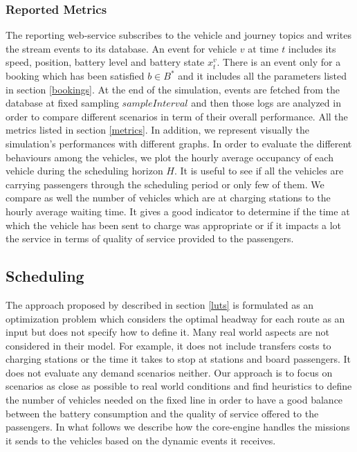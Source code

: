 \documentclass[12pt,a4paper]{article}
\begin{document}
\subsubsection{Reported Metrics}
The reporting web-service subscribes to the vehicle and journey topics and writes the stream events to its database. An event for vehicle $v$ at time $t$ includes its speed, position, battery level and battery state $x_{t}^{v}$. There is an event only for a booking which has been satisfied $b \in B^{*}$ and it includes all the parameters listed in section \ref{bookings}. At the end of the simulation, events are fetched from the database at fixed sampling $sampleInterval$ and then those logs are analyzed in order to compare different scenarios in term of their overall performance. All the metrics listed in section \ref{metrics}. In addition, we represent visually the simulation's performances with different graphs. In order to evaluate the different behaviours among the vehicles, we plot the hourly average occupancy of each vehicle during the scheduling horizon $H$. It is useful to see if all the vehicles are carrying passengers through the scheduling period or only few of them. We compare as well the number of vehicles which are at charging stations to the hourly average waiting time. It gives a good indicator to determine if the time at which the vehicle has been sent to charge was appropriate or if it impacts a lot the service in terms of quality of service provided to the passengers.

\subsection{Scheduling}\label{scheduling}
The approach proposed by \cite{luts} described in section \ref{luts} is formulated as an optimization problem which considers the optimal headway for each route as an input but does not specify how to define it. Many real world aspects are not considered in their model. For example, it does not include transfers costs to charging stations or the time it takes to stop at stations and board passengers. It does not evaluate any demand scenarios neither. Our approach is to focus on scenarios as close as possible to real world conditions and find heuristics to define the number of vehicles needed on the fixed line in order to have a good balance between the battery consumption and the quality of service offered to the passengers. In what follows we describe how the core-engine handles the missions it sends to the vehicles based on the dynamic events it receives. 
\end{document}
